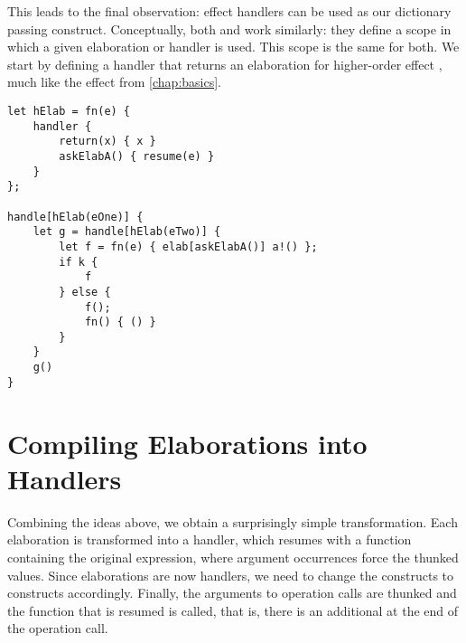 This leads to the final observation: effect handlers can be used as our dictionary passing construct. Conceptually, both  and  work similarly: they define a scope in which a given elaboration or handler is used. This scope is the same for both. We start by defining a handler that returns an elaboration for higher-order effect , much like the  effect from \cref{chap:basics}.

\begin{lstlisting}[language=elaine,style=fancy]
let hElab = fn(e) {
    handler {
        return(x) { x }
        askElabA() { resume(e) }
    }
};

handle[hElab(eOne)] {
    let g = handle[hElab(eTwo)] {
        let f = fn(e) { elab[askElabA()] a!() };
        if k {
            f
        } else {
            f();
            fn() { () }
        }
    }
    g()
}
\end{lstlisting}


\section{Compiling Elaborations into Handlers}

Combining the ideas above, we obtain a surprisingly simple transformation. Each elaboration is transformed into a handler, which resumes with a function containing the original expression, where argument occurrences force the thunked values. Since elaborations are now handlers, we need to change the  constructs to  constructs accordingly. Finally, the arguments to operation calls are thunked and the function that is resumed is called, that is, there is an additional \el{()} at the end of the operation call.

